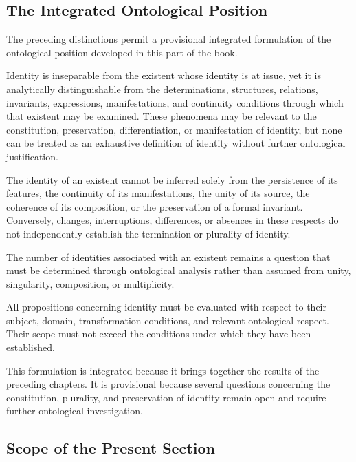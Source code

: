 \subsection{The Integrated Ontological Position}

The preceding distinctions permit a provisional integrated
formulation of the ontological position developed in this
part of the book.

Identity is inseparable from the existent whose identity
is at issue, yet it is analytically distinguishable from
the determinations, structures, relations, invariants,
expressions, manifestations, and continuity conditions
through which that existent may be examined. These
phenomena may be relevant to the constitution, preservation,
differentiation, or manifestation of identity, but none
can be treated as an exhaustive definition of identity
without further ontological justification.

The identity of an existent cannot be inferred solely
from the persistence of its features, the continuity of
its manifestations, the unity of its source, the coherence
of its composition, or the preservation of a formal
invariant. Conversely, changes, interruptions, differences,
or absences in these respects do not independently
establish the termination or plurality of identity.

The number of identities associated with an existent
remains a question that must be determined through
ontological analysis rather than assumed from unity,
singularity, composition, or multiplicity.

All propositions concerning identity must be evaluated
with respect to their subject, domain, transformation
conditions, and relevant ontological respect. Their
scope must not exceed the conditions under which they
have been established.

This formulation is integrated because it brings together
the results of the preceding chapters. It is provisional
because several questions concerning the constitution,
plurality, and preservation of identity remain open and
require further ontological investigation.


\subsection{Scope of the Present Section}

